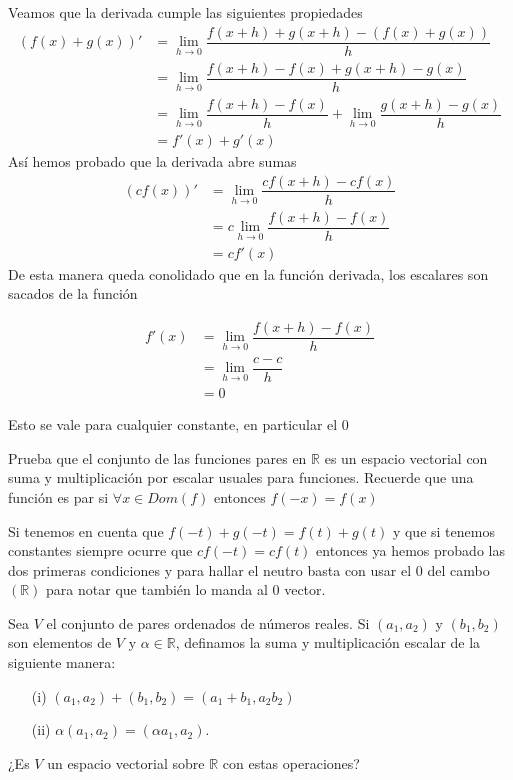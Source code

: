 \documentclass[letterpaper]{article}
\newcommand{\R}{\mathds{R}}
\renewcommand{\*}{\cdot}
\theoremstyle{definition}
\begin{document}
	Veamos que la derivada cumple las siguientes propiedades
	\begin{align*}
	(f(x) + g(x))' &= \lim_{h\to 0} \dfrac{f(x +h) + g(x + h) - (f(x) + g(x))}{h}\\
	& = \lim_{h\to 0} \dfrac{f(x+h) - f(x) + g(x+h) - g(x)}{h}\\
	&= \lim_{h\to 0} \dfrac{f(x+h)-f(x)}{h} + \lim_{h\to 0} \dfrac{g(x+h)-g(x)}{h}\\
	&=f'(x) + g'(x)
	\end{align*}
	Así hemos probado que la derivada abre sumas
	\begin{align*}
	(cf(x))' &= \lim_{h\to 0} \dfrac{cf(x + h) - cf(x)}{h}\\
	& = c\lim_{h\to 0} \dfrac{f(x+h)-f(x)}{h}\\
	&= cf'(x)
	\end{align*}
	De esta manera queda conolidado que en la función derivada, los escalares son sacados de la función
	
	\begin{align*}
	f'(x) &= \lim_{h\to 0} \dfrac{f(x + h) - f(x)}{h}\\
	& = \lim_{h\to 0} \dfrac{c-c}{h}\\
	&= 0
	\end{align*}
	\begin{center}
		Esto se vale para cualquier constante, en particular el 0
	\end{center}
	
 \begin{ejercicio}{3}
 	Prueba que el conjunto de las funciones pares en $\mathbb{R}$ es un espacio vectorial con suma y multiplicación por escalar usuales para funciones. Recuerde que una función es par si $\forall x \in Dom(f)$ entonces $f(-x) = f(x)$ 
 \end{ejercicio}
 	
 	Si tenemos en cuenta que $f(-t) + g(-t) = f(t) + g(t)$ y que si tenemos constantes siempre ocurre que $cf(-t) = cf(t) $ entonces ya hemos probado las dos primeras condiciones y para hallar el neutro basta con usar el 0 del cambo $(\R)$ para notar que también lo manda al 0 vector.\\
 	
\begin{ejercicio}{4}
	Sea $V$ el conjunto de pares ordenados de números reales. Si $(a_{1},a_{2})$ y $(b_{1},b_{2})$ son elementos de $V$ y $\alpha \in \mathbb{R}$, definamos la suma y multiplicación escalar de la siguiente manera:
	\begin{enumerate}
		\item[(i)] $(a_{1},a_{2}) + (b_{1},b_{2}) = (a_{1} + b_{1}, a_{2}b_{2})$ 
		\item[(ii)] $\alpha(a_{1},a_{2}) = (\alpha a_{1},a_{2})$.\\
	\end{enumerate}
	¿Es $V$ un espacio vectorial sobre $\mathbb{R}$ con estas operaciones?\\
\end{ejercicio}
\end{document}
